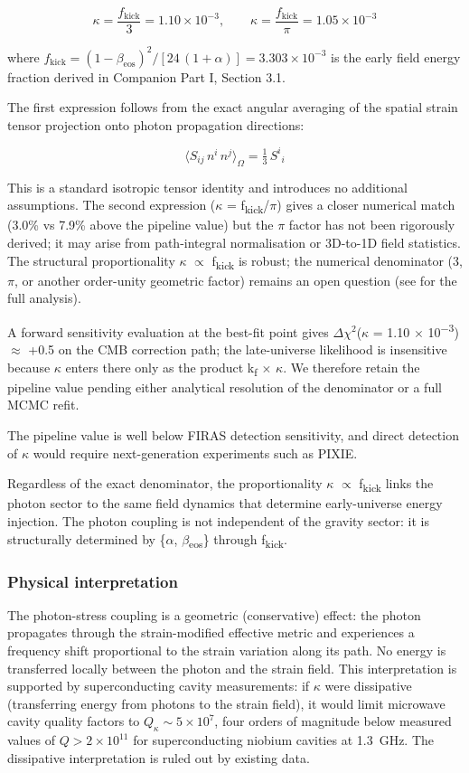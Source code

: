 \documentclass[11pt,a4paper]{article}
\begin{document}
$$
\kappa = \frac{f_{\mathrm{kick}}}{3} = 1.10 \times 10^{-3}, \qquad \kappa = \frac{f_{\mathrm{kick}}}{\pi} = 1.05 \times 10^{-3}
$$

where \(f_{\mathrm{kick}} = (1-\beta_{\mathrm{eos}})^2 / [24\,(1+\alpha)] = 3.303 \times 10^{-3}\) is the early field energy fraction derived in Companion Part I, Section 3.1.

The first expression follows from the exact angular averaging of the spatial strain tensor projection onto photon propagation directions:

$$
\langle S_{ij}\,n^i\,n^j \rangle_{\Omega} = \tfrac{1}{3}\,S^i{}_i
$$

This is a standard isotropic tensor identity and introduces no additional assumptions. The second expression ($\kappa$ = f\textsubscript{kick}/$\pi$) gives a closer numerical match (3.0\% vs 7.9\% above the pipeline value) but the $\pi$ factor has not been rigorously derived; it may arise from path-integral normalisation or 3D-to-1D field statistics. The structural proportionality $\kappa$ $\propto$ f\textsubscript{kick} is robust; the numerical denominator (3, $\pi$, or another order-unity geometric factor) remains an open question (see {\small\protect{}} for the full analysis).

A forward sensitivity evaluation at the best-fit point gives $\Delta$$\chi$$^{2}$($\kappa$ = 1.10 $\times$ 10\textsuperscript{$-$3}) $\approx$ +0.5 on the CMB correction path; the late-universe likelihood is insensitive because $\kappa$ enters there only as the product k\textsubscript{f} $\times$ $\kappa$. We therefore retain the pipeline value pending either analytical resolution of the denominator or a full MCMC refit.

The pipeline value is well below FIRAS detection sensitivity, and direct detection of $\kappa$ would require next-generation experiments such as PIXIE.

Regardless of the exact denominator, the proportionality $\kappa$ $\propto$ f\textsubscript{kick} links the photon sector to the same field dynamics that determine early-universe energy injection. The photon coupling is not independent of the gravity sector: it is structurally determined by \{$\alpha$, $\beta$\textsubscript{eos}\} through f\textsubscript{kick}.

\subsubsection{Physical interpretation}
The photon-stress coupling is a geometric (conservative) effect: the photon propagates through the strain-modified effective metric and experiences a frequency shift proportional to the strain variation along its path. No energy is transferred locally between the photon and the strain field. This interpretation is supported by superconducting cavity measurements: if \(\kappa\) were dissipative (transferring energy from photons to the strain field), it would limit microwave cavity quality factors to \(Q_\kappa \sim 5 \times 10^7\), four orders of magnitude below measured values of \(Q > 2 \times 10^{11}\) for superconducting niobium cavities at 1.3~GHz. The dissipative interpretation is ruled out by existing data.
\end{document}
